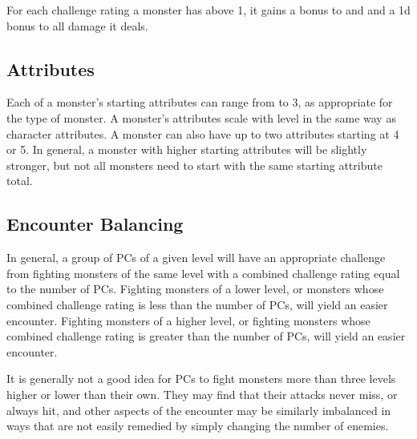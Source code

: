          For each challenge rating a monster has above 1, it gains a  bonus to  and  and a \plus1d bonus to all damage it deals.

    \subsection{Attributes}
        Each of a monster's starting attributes can range from  to 3, as appropriate for the type of monster.
        A monster's attributes scale with level in the same way as character attributes.
        A monster can also have up to two attributes starting at 4 or 5.
        In general, a monster with higher starting attributes will be slightly stronger, but not all monsters need to start with the same starting attribute total.

    \subsection{Encounter Balancing}\label{Encounter Balancing}
        In general, a group of PCs of a given level will have an appropriate challenge from fighting monsters of the same level with a combined challenge rating equal to the number of PCs.
        Fighting monsters of a lower level, or monsters whose combined challenge rating is less than the number of PCs, will yield an easier encounter.
        Fighting monsters of a higher level, or fighting monsters whose combined challenge rating is greater than the number of PCs, will yield an easier encounter.

        It is generally not a good idea for PCs to fight monsters more than three levels higher or lower than their own.
        They may find that their attacks never miss, or always hit, and other aspects of the encounter may be similarly imbalanced in ways that are not easily remedied by simply changing the number of enemies.


